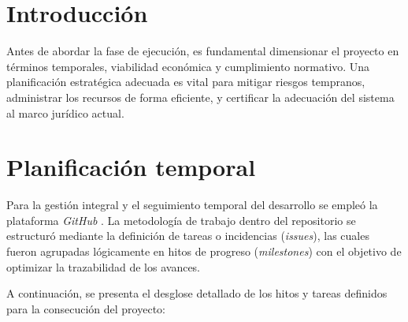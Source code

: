 \section{Introducción}
Antes de abordar la fase de ejecución, es fundamental dimensionar el proyecto en términos temporales, viabilidad económica y cumplimiento normativo. Una planificación estratégica adecuada es vital para mitigar riesgos tempranos, administrar los recursos de forma eficiente, y certificar la adecuación del sistema al marco jurídico actual.

\section{Planificación temporal}
Para la gestión integral y el seguimiento temporal del desarrollo se empleó la plataforma \textit{GitHub} \cite{github}. La metodología de trabajo dentro del repositorio se estructuró mediante la definición de tareas o incidencias (\textit{issues}), las cuales fueron agrupadas lógicamente en hitos de progreso (\textit{milestones}) con el objetivo de optimizar la trazabilidad de los avances.

A continuación, se presenta el desglose detallado de los hitos y tareas definidos para la consecución del proyecto:

